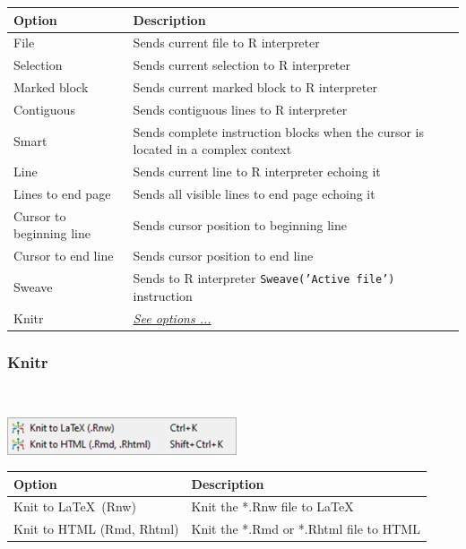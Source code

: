\begin{scriptsize}
  \begin{tabularx}{\textwidth}{>{\hsize=0.5\hsize}X>{\hsize=0.7\hsize}X}\\
    \hline
    \textbf{Option} & \textbf{Description} \\
    \hline
    File & Sends current file to R interpreter \\
    Selection & Sends current selection to R interpreter \\
    Marked block & Sends current marked block to R interpreter \\
		  Contiguous & Sends contiguous lines to R interpreter \\
    Smart & Sends complete instruction blocks when the cursor is located in a complex context \\
    Line & Sends current line to R interpreter echoing it \\
    Lines to end page & Sends all visible lines to end page echoing it \\
    Cursor to beginning line & Sends cursor position to beginning line \\
    Cursor to end line & Sends cursor position to end line \\
    Sweave & Sends to R interpreter \texttt{Sweave('Active file')} instruction \\
    Knitr & \textit{\href{\#menu\_r\_send\_knitr}{See options ...}} \\
    \hline
  \end{tabularx}
\end{scriptsize}

\hypertarget{menu_r_send_knitr}{}
\subsubsection{Knitr}\\

\includegraphics[scale=0.50]{./res/menu_r_send_knitr.png}\\

\begin{scriptsize}
  \begin{tabularx}{\textwidth}{>{\hsize=0.3\hsize}X>{\hsize=0.7\hsize}X}\\
    \hline
    \textbf{Option} & \textbf{Description} \\
    \hline
    Knit to \LaTeX ~(Rnw) & Knit the *.Rnw file to \LaTeX \\
    Knit to HTML (Rmd, Rhtml) & Knit the *.Rmd or *.Rhtml file to HTML\\
    \hline
  \end{tabularx}
\end{scriptsize}


